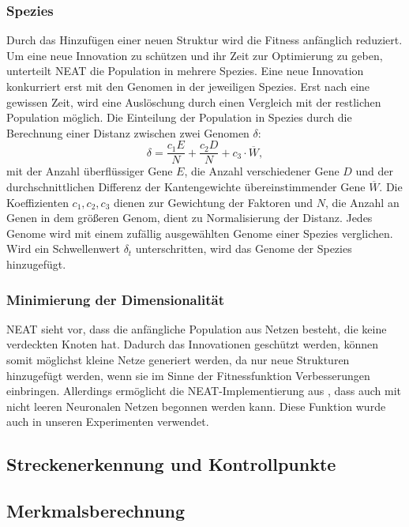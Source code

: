 \documentclass[11pt,final,journal,a4paper,towside,towcolumn]{IEEEtran}
\begin{document}
\subsubsection{Spezies}
Durch das Hinzufügen einer neuen Struktur wird die Fitness anfänglich reduziert. Um eine neue Innovation zu schützen und ihr Zeit zur Optimierung zu geben, unterteilt \ac{NEAT} die Population in mehrere Spezies. Eine neue Innovation konkurriert erst mit den Genomen in der jeweiligen Spezies. Erst nach eine gewissen Zeit, wird eine Auslöschung durch einen Vergleich mit der restlichen Population möglich. Die Einteilung der Population in Spezies durch die Berechnung einer Distanz zwischen zwei Genomen $\delta$:
\begin{equation}
\delta=\frac{c_1E}{N} + \frac{c_2D}{N} + c_3\cdot \overline{W},
\end{equation}
mit der Anzahl überflüssiger Gene $E$, die Anzahl verschiedener Gene $D$ und der durchschnittlichen Differenz der Kantengewichte übereinstimmender Gene $\overline{W}$. Die Koeffizienten $c_1, c_2, c_3$ dienen zur Gewichtung der Faktoren und $N$, die Anzahl an Genen in dem größeren Genom, dient zu Normalisierung der Distanz. Jedes Genome wird mit einem zufällig ausgewählten Genome einer Spezies verglichen. Wird ein Schwellenwert $\delta_t$ unterschritten, wird das Genome der Spezies hinzugefügt.
\subsubsection{Minimierung der Dimensionalität}
\ac{NEAT} sieht vor, dass die anfängliche Population aus Netzen besteht, die keine verdeckten Knoten hat. Dadurch das Innovationen geschützt werden, können somit möglichst kleine Netze generiert werden, da nur neue Strukturen hinzugefügt werden, wenn sie im Sinne der Fitnessfunktion Verbesserungen einbringen.
Allerdings ermöglicht die \ac{NEAT}-Implementierung aus \cite{python-neat}, dass auch mit nicht leeren Neuronalen Netzen begonnen werden kann. Diese Funktion wurde auch in unseren Experimenten verwendet.

\subsection{Streckenerkennung und Kontrollpunkte}

\subsection{Merkmalsberechnung}
\end{document}
